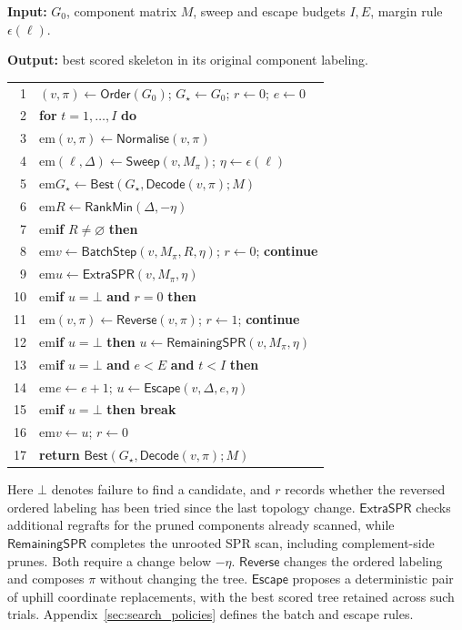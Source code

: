 \documentclass[11pt,a4paper]{article}
\makeatletter
\newcommand{\algindent}[1]{\hangindent=#1em\hangafter=1\hspace*{#1em}}
\newcommand{\proc}[1]{\mathsf{#1}}
\DeclareRobustCommand{\_}{\ifmmode\nfss@text{\textunderscore}\else\textunderscore\allowbreak\fi}
\theoremstyle{definition}
\makeatother
\begin{document}
\begin{algorithm}[!htbp]
\caption{CPU skeleton search}
\label{alg:coordinate_search}
\small
\textbf{Input:} $G_0$, component matrix $M$, sweep and escape budgets $I,E$, margin rule $\epsilon(\ell)$.\par
\textbf{Output:} best scored skeleton in its original component labeling.\par\smallskip
\begin{tabular}{@{}r@{\quad}>{\raggedright\arraybackslash}p{.93\linewidth}@{}}
1 & $(v,\pi)\gets\proc{Order}(G_0)$; $G_\star\gets G_0$; $r\gets0$; $e\gets0$\\
2 & \textbf{for} $t=1,\ldots,I$ \textbf{do}\\
3 & \algindent{1}$(v,\pi)\gets\proc{Normalise}(v,\pi)$\\
4 & \algindent{1}$(\ell,\Delta)\gets\proc{Sweep}(v,M_\pi)$; $\eta\gets\epsilon(\ell)$\\
5 & \algindent{1}$G_\star\gets\proc{Best}(G_\star,\proc{Decode}(v,\pi);M)$\\
6 & \algindent{1}$R\gets\proc{RankMin}(\Delta,-\eta)$\\
7 & \algindent{1}\textbf{if} $R\ne\varnothing$ \textbf{then}\\
8 & \algindent{2}$v\gets\proc{BatchStep}(v,M_\pi,R,\eta)$; $r\gets0$; \textbf{continue}\\
9 & \algindent{1}$u\gets\proc{ExtraSPR}(v,M_\pi,\eta)$\\
10 & \algindent{1}\textbf{if} $u=\bot$ \textbf{and} $r=0$ \textbf{then}\\
11 & \algindent{2}$(v,\pi)\gets\proc{Reverse}(v,\pi)$; $r\gets1$; \textbf{continue}\\
12 & \algindent{1}\textbf{if} $u=\bot$ \textbf{then} $u\gets\proc{RemainingSPR}(v,M_\pi,\eta)$\\
13 & \algindent{1}\textbf{if} $u=\bot$ \textbf{and} $e<E$ \textbf{and} $t<I$ \textbf{then}\\
14 & \algindent{2}$e\gets e+1$; $u\gets\proc{Escape}(v,\Delta,e,\eta)$\\
15 & \algindent{1}\textbf{if} $u=\bot$ \textbf{then break}\\
16 & \algindent{1}$v\gets u$; $r\gets0$\\
17 & \textbf{return} $\proc{Best}(G_\star,\proc{Decode}(v,\pi);M)$\\
\end{tabular}
\end{algorithm}

Here $\bot$ denotes failure to find a candidate, and $r$ records whether the reversed ordered labeling has been tried since the last topology change.
$\proc{ExtraSPR}$ checks additional regrafts for the pruned components already scanned, while $\proc{RemainingSPR}$ completes the unrooted SPR scan, including complement-side prunes.
Both require a change below $-\eta$.
$\proc{Reverse}$ changes the ordered labeling and composes $\pi$ without changing the tree.
$\proc{Escape}$ proposes a deterministic pair of uphill coordinate replacements, with the best scored tree retained across such trials.
Appendix~\ref{sec:search_policies} defines the batch and escape rules.
\end{document}
